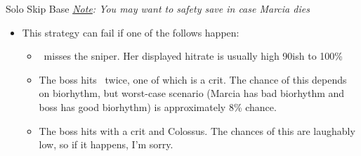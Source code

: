 \begin{battle}{Solo}
\newline\newline Skip Base
\textit{\underline{Note}: You may want to safety save in case Marcia dies}
\vspace{3mm}
\begin{enumerate}
\end{enumerate}
\vspace{3mm}
\begin{itemize}
    \item This strategy can fail if one of the follows happen:
    \begin{itemize}
        \item \tanith\ misses the sniper. Her displayed hitrate is usually high 90ish to 100\%
        \item The boss hits \marcia\ twice, one of which is a crit. The chance of this depends on biorhythm, but worst-case scenario (Marcia has bad biorhythm and boss has good biorhythm) is approximately 8\% chance.
        \item The boss hits \marcia with a crit and Colossus. The chances of this are laughably low, so if it happens, I’m sorry.
    \end{itemize}   
\end{itemize}
\end{battle}